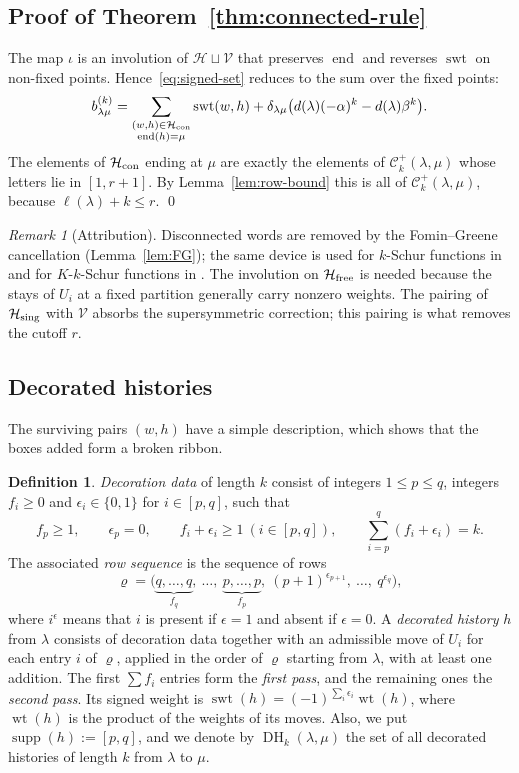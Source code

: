 \documentclass[11pt]{amsart}
\numberwithin{equation}{section}
\theoremstyle{definition}
\newtheorem{definition}[theorem]{Definition}
\theoremstyle{remark}
\newtheorem{remark}[theorem]{Remark}
\newcommand{\wt}{\operatorname{wt}}
\newcommand{\swt}{\operatorname{swt}}
\newcommand{\supp}{\operatorname{supp}}
\newcommand{\enD}{\operatorname{end}}
\newcommand{\cC}{\mathcal C}
\newcommand{\cH}{\mathcal H}
\newcommand{\DHist}{\operatorname{DH}}
\begin{document}
\subsection{Proof of Theorem~\ref{thm:connected-rule}}\label{proof of}

The map $\iota$ is an involution of $\cH\sqcup\mathcal V$ that preserves
$\enD$ and reverses $\swt$ on non-fixed points. Hence~\eqref{eq:signed-set}
reduces to the sum over the fixed points:
\[
 b^{(k)}_{\lambda\mu}
 =\sum_{\substack{(w,h)\in\cH_{\rm con}\\ \enD(h)=\mu}}\swt(w,h)
 +\delta_{\lambda\mu}\bigl(d(\lambda)(-\alpha)^k-d(\lambda)\beta^k\bigr).
\]
The elements of $\cH_{\rm con}$ ending at $\mu$ are exactly the elements of
$\cC^+_k(\lambda,\mu)$ whose letters lie in $[1,r+1]$. By
Lemma~\ref{lem:row-bound} this is all of $\cC^+_k(\lambda,\mu)$, because
$\ell(\lambda)+k\leq r$. \qed

\begin{remark}[Attribution]\label{rem:FG}
Disconnected words are removed by the Fomin--Greene cancellation
(Lemma~\ref{lem:FG}); the same device is used for $k$-Schur functions in
\cite{BSZ} and for $K$-$k$-Schur functions in \cite{NguyenKk}. The
involution on $\cH_{\rm free}$ is needed because the stays of $U_i$ at a
fixed partition generally carry nonzero weights. The pairing of
$\cH_{\rm sing}$ with $\mathcal V$ absorbs the supersymmetric correction;
this pairing is what removes the cutoff $r$.
\end{remark}

\subsection{Decorated histories}

The surviving pairs $(w,h)$ have a simple description, which shows that the
boxes added form a broken ribbon.

\begin{definition}\label{def:decorated}
\emph{Decoration data} of length $k$ consist of integers $1\leq p\leq q$,
integers $f_i\geq0$ and $\epsilon_i\in\{0,1\}$ for $i\in[p,q]$, such that
\[
 f_p\geq1,\qquad \epsilon_p=0,\qquad f_i+\epsilon_i\geq1\ (i\in[p,q]),
 \qquad \sum_{i=p}^q(f_i+\epsilon_i)=k .
\]
The associated \emph{row sequence} is the sequence of rows
\[
 \varrho=\bigl(\underbrace{q,\dots,q}_{f_q},\ \dots,\ \underbrace{p,\dots,p}_{f_p},\
 (p+1)^{\epsilon_{p+1}},\ \dots,\ q^{\epsilon_q}\bigr),
\]
where $i^{\epsilon}$ means that $i$ is present if $\epsilon=1$ and absent if
$\epsilon=0$. A \emph{decorated history} $h$ from $\lambda$ consists of decoration
data together with an admissible move of $U_i$ for each entry $i$ of
$\varrho$, applied in the order of $\varrho$ starting from $\lambda$, with at
least one addition. The first $\sum f_i$ entries form the \emph{first
pass}, and the remaining ones the \emph{second pass}. Its signed weight is $\swt(h)=(-1)^{\sum_i\epsilon_i}\wt(h)$, where $\wt(h)$ is the product of the weights of its moves. Also, we put $\supp(h):=[p,q]$, and we denote by $\DHist_k(\lambda,\mu)$ the set of all decorated histories of length $k$ from $\lambda$ to $\mu$.
\end{definition}
\end{document}
